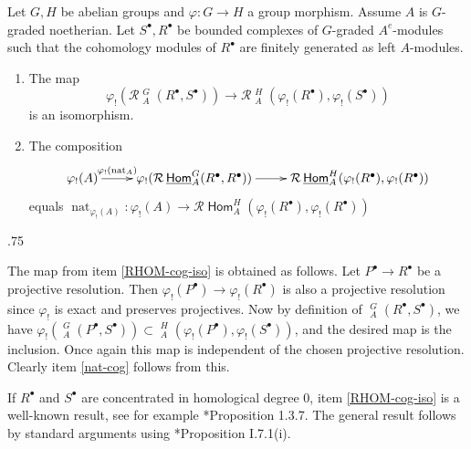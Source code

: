 \documentclass[11pt,fleqn]{article}
\makeatletter
\renewenvironment{proof}[1][\textit{Proof}]{\par
  \pushQED{\qed}%
  \normalfont \topsep.75\paraskip\relax
  \trivlist
  \item[\hskip\labelsep
        \itshape
    #1\@addpunct{.}]\ignorespaces
}{%
  \popQED\endtrivlist\@endpefalse
}
\renewcommand\to{\longrightarrow}
\renewcommand\phi{\varphi}
\newcommand\R{\mathcal R}
\DeclareMathOperator\Hom{\mathsf{Hom}}
\DeclareMathOperator\HOM{\underline{\mathsf{Hom}}}
\DeclareMathOperator\nat{nat}
\makeatother
\begin{document}
\begin{Lemma}
\label{natural-map-lemma}
Let $G,H$ be abelian groups and $\phi: G \to H$ a group morphism. Assume $A$ 
is $G$-graded noetherian. Let $S^\bullet, R^\bullet$ be bounded 
complexes of $G$-graded $A^e$-modules such that the cohomology modules of 
$R^\bullet$ are finitely generated as left $A$-modules. 
\begin{enumerate}
\item 
\label{RHOM-cog-iso}
The map
\[
  \phi_!(\R\HOM_A^G(R^\bullet, S^\bullet)) 
    \to \R\HOM_A^H(\phi_!(R^\bullet), \phi_!(S^\bullet))
\]
is an isomorphism.

\item 
\label{nat-cog}
The composition 
\begin{align*}
\xymatrix{
\phi_!(A) 
    \ar[r]^-{\phi_!(\nat_A)}
    &\phi_!(\R\HOM_A^G(R^\bullet, R^\bullet)) \ar[r]
    &\R\HOM_A^H(\phi_!(R^\bullet), \phi_!(R^\bullet))
}
\end{align*}
equals $\nat_{\phi_!(A)}: \phi_!(A) \to \R\Hom_A^H(\phi_!(R^\bullet), 
\phi_!(R^\bullet))$
\end{enumerate}
\end{Lemma}
\begin{proof}
The map from item \ref{RHOM-cog-iso} is obtained as follows. Let $P^\bullet
\to R^\bullet$ be a projective resolution. Then $\phi_!(P^\bullet) \to 
\phi_!(R^\bullet)$ is also a projective resolution since $\phi_!$ is exact and 
preserves projectives. Now by definition of $\HOM^G_A(R^\bullet, S^\bullet)$, 
we have $\phi_!(\HOM_A^{G}(P^\bullet, S^\bullet)) \subset \HOM_A^{H}
(\phi_!(P^\bullet), \phi_!(S^\bullet))$, and the desired map is the inclusion. 
Once again this map is independent of the chosen projective resolution. 
Clearly item \ref{nat-cog} follows from this.

If $R^\bullet$ and $S^\bullet$ are concentrated in homological degree $0$,
item \ref{RHOM-cog-iso} is a well-known result, see for example 
\cite{RZ-twisted}*{Proposition 1.3.7}. The general result follows by standard 
arguments using \cite{Hart-RD}*{Proposition I.7.1(i)}.
\end{proof}
\end{document}

